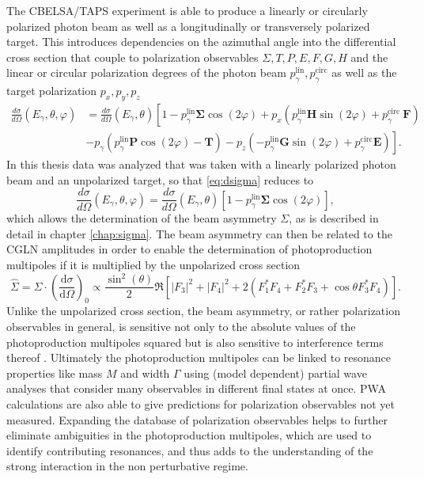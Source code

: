 \noindent The CBELSA/TAPS experiment is able to produce a linearly or circularly polarized photon beam as well as a longitudinally or transversely polarized target. This introduces dependencies on the azimuthal angle into the differential cross section that couple to polarization observables $\Sigma,T,P,E,F,G,H$ and the linear or circular polarization degrees of the photon beam $p_\gamma^\text{lin},p_\gamma^\text{circ}$ as well as the target polarization $p_x,p_y,p_z$\cite{san}
\begin{equation}
	\begin{aligned}
		\frac{d \sigma}{d \Omega}\left(E_\gamma, \theta, \varphi\right) &=\frac{d \sigma}{d \Omega}\left(E_\gamma, \theta\right)\left[1-p_{\gamma}^{\operatorname{lin}} \mathbf{\Sigma} \cos (2 \varphi)+p_{x}\left(p_{\gamma}^{\operatorname{lin}} \mathbf{H} \sin (2 \varphi)+p_{\gamma}^{\text {circ }} \mathbf{F}\right)\right.\\
		&\left.-p_{\gamma}\left(p_{\gamma}^{\operatorname{lin}} \mathbf{P} \cos (2 \varphi)-\mathbf{T}\right)-p_{z}\left(-p_{\gamma}^{\operatorname{lin}} \mathbf{G} \sin (2 \varphi)+p_{\gamma}^{\mathrm{circ}} \mathbf{E}\right)\right].
	\end{aligned}
	\label{eq:dsigma}
\end{equation}
In this thesis data was analyzed that was taken with a linearly polarized photon beam and an unpolarized target, so that \eqref{eq:dsigma} reduces to 
\begin{equation}
	\frac{d \sigma}{d \Omega}\left(E_\gamma, \theta, \varphi\right)=\frac{d \sigma}{d \Omega}\left(E_\gamma, \theta\right)\left[1-p_{\gamma}^{\operatorname{lin}} \boldsymbol{\Sigma} \cos (2 \varphi)\right],
\end{equation}
which allows the determination of the beam asymmetry $\Sigma$, as is described in detail in chapter \ref{chap:sigma}. The beam asymmetry can then be related to the CGLN amplitudes in order to enable the determination of photoproduction multipoles if it is multiplied by the unpolarized cross section \cite{fasano}
\begin{equation}
	\widehat{\Sigma}=\Sigma\cdot\left(\frac{\text{d}\sigma}{\text{d}\Omega}\right)_0\propto\frac{\sin^2(\theta)}{2}\Re \left[\left|F_3\right|^2+\left|F_4\right|^2+2\left(F_1^*F_4+F_2^*F_3+\cos\theta F_3^*F_4\right)\right].
\end{equation}
Unlike the unpolarized cross section, the beam asymmetry, or rather polarization observables in general, is sensitive not only to the absolute values of the photoproduction multipoles squared but is also sensitive to interference terms thereof \cite{farahphd,Wunderlich_2017}. Ultimately the photoproduction multipoles can be linked to resonance properties like mass $M$ and width $\Gamma$ using (model dependent) partial wave analyses that consider many observables in different final states at once. PWA calculations are also able to give predictions for polarization observables not yet measured. Expanding the database of polarization observables helps to further eliminate ambiguities in the photoproduction multipoles, which are used to identify contributing resonances, and thus adds to the understanding of the strong interaction in the non perturbative regime.
